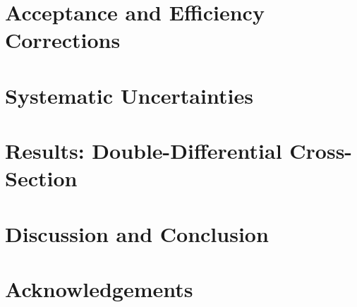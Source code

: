 \documentclass[11pt]{article}
\begin{document}

\section{Acceptance and Efficiency Corrections}
\label{sec:corrections}

\FloatBarrier

\section{Systematic Uncertainties}
\label{sec:systematics}

\FloatBarrier

\section{Results: Double-Differential Cross-Section}
\label{sec:results}

\clearpage

\section{Discussion and Conclusion}
\label{sec:conclusion}


\section{Acknowledgements}


\clearpage
\end{document}
